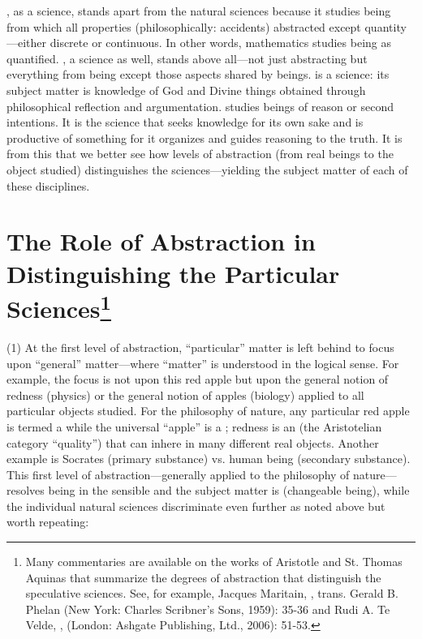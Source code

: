 , as a science, stands apart from the natural sciences because it studies being from which all properties (philosophically: accidents) abstracted except quantity---either discrete or continuous. In other words, mathematics studies being as quantified. , a science as well, stands above all---not just abstracting but  everything from being except those aspects shared by  beings.  is a science: its subject matter is knowledge of God and Divine things obtained through philosophical reflection and argumentation.  studies beings of reason or second intentions. It is the science that seeks knowledge for its own sake and is productive of something for it organizes and guides reasoning to the truth. It is from this that we better see how levels of abstraction (from real beings to the object studied) distinguishes the sciences---yielding the subject matter of each of these disciplines.


\section[The Role of Abstraction in Distinguishing the Particular Sciences]{The Role of Abstraction in Distinguishing the Particular Sciences\footnote{Many commentaries are available on the works of Aristotle and St. Thomas Aquinas that summarize the degrees of abstraction that distinguish the speculative sciences. See, for example, Jacques Maritain, , trans. Gerald B. Phelan (New York: Charles Scribner's Sons, 1959): 35-36 and Rudi A. Te Velde, , (London: Ashgate Publishing, Ltd., 2006): 51-53.}}

(1) At the first level of abstraction, ``particular'' matter is left behind to focus upon ``general'' matter---where ``matter'' is understood in the logical sense. For example, the focus is not upon this red apple but upon the general notion of redness (physics) or the general notion of apples (biology)  applied to all particular objects studied. For the philosophy of nature, any particular red apple is termed a  while the universal ``apple'' is a ; redness is an  (the Aristotelian category ``quality'') that can inhere in many different real objects. Another example is Socrates (primary substance) vs. human being (secondary substance). This first level of abstraction---generally applied to the philosophy of nature---resolves being in the sensible and the subject matter is  (changeable being), while the individual natural sciences discriminate even further as noted above but worth repeating:

